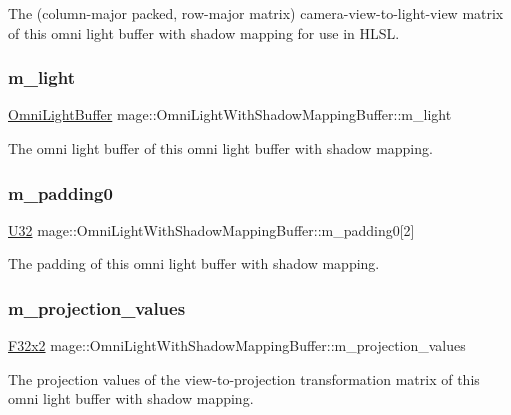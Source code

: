 The (column-\/major packed, row-\/major matrix) camera-\/view-\/to-\/light-\/view matrix of this omni light buffer with shadow mapping for use in H\+L\+SL. \hypertarget{structmage_1_1_omni_light_with_shadow_mapping_buffer_ad04cdb09bc31de362f8f4f75aa5b6aea}{}\label{structmage_1_1_omni_light_with_shadow_mapping_buffer_ad04cdb09bc31de362f8f4f75aa5b6aea} 
\subsubsection{\texorpdfstring{m\+\_\+light}{m\_light}}
{\footnotesize\ttfamily \hyperlink{structmage_1_1_omni_light_buffer}{Omni\+Light\+Buffer} mage\+::\+Omni\+Light\+With\+Shadow\+Mapping\+Buffer\+::m\+\_\+light}

The omni light buffer of this omni light buffer with shadow mapping. \hypertarget{structmage_1_1_omni_light_with_shadow_mapping_buffer_aaaf8cc62c3bb6607d2efb6c0b5069f87}{}\label{structmage_1_1_omni_light_with_shadow_mapping_buffer_aaaf8cc62c3bb6607d2efb6c0b5069f87} 
\subsubsection{\texorpdfstring{m\+\_\+padding0}{m\_padding0}}
{\footnotesize\ttfamily \hyperlink{namespacemage_a41c104c036fba3756a74e19f793eeaa1}{U32} mage\+::\+Omni\+Light\+With\+Shadow\+Mapping\+Buffer\+::m\+\_\+padding0\mbox{[}2\mbox{]}}

The padding of this omni light buffer with shadow mapping. \hypertarget{structmage_1_1_omni_light_with_shadow_mapping_buffer_a4eed76cd814c81bfcb6300d69f7d7024}{}\label{structmage_1_1_omni_light_with_shadow_mapping_buffer_a4eed76cd814c81bfcb6300d69f7d7024} 
\subsubsection{\texorpdfstring{m\+\_\+projection\+\_\+values}{m\_projection\_values}}
{\footnotesize\ttfamily \hyperlink{namespacemage_aa87237ad091f5cd7da612b8523fc108f}{F32x2} mage\+::\+Omni\+Light\+With\+Shadow\+Mapping\+Buffer\+::m\+\_\+projection\+\_\+values}

The projection values of the view-\/to-\/projection transformation matrix of this omni light buffer with shadow mapping. 